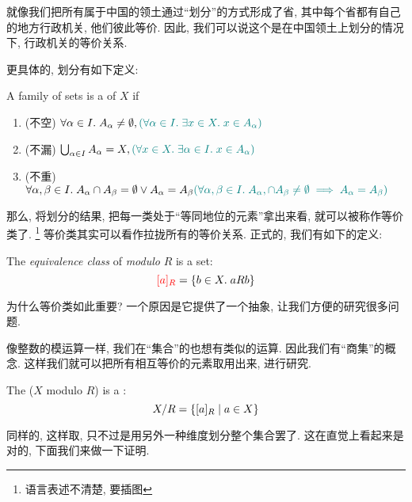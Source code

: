 就像我们把所有属于中国的领土通过``划分''的方式形成了省, 其中每个省都有自己的地方行政机关, 他们彼此等价. 因此, 我们可以说这个是在中国领土上划分的情况下, 行政机关的等价关系. 

更具体的, 划分有如下定义: 

\begin{definition}[划分 (Partition)]
  A family of sets 
  is a  of $X$ if

  \begin{enumerate}
    \item (不空)
      $\forall \alpha \in I.\; A_{\alpha} \neq \emptyset,\textcolor{teal}{(\forall \alpha \in I.\; \exists x \in X.\; x \in A_{\alpha})}$
    \item (不漏)
      $\bigcup_{\alpha \in I} A_{\alpha} = X, \textcolor{teal}{(\forall x \in X.\; \exists \alpha \in I.\; x \in A_{\alpha})}$
    \item (不重)
      $
        \forall \alpha, \beta \in I.\; A_{\alpha} \cap A_{\beta} = \emptyset \lor A_{\alpha} = A_{\beta}
        \textcolor{teal}{(\forall \alpha, \beta \in I.\; A_{\alpha}, \cap A_{\beta} \neq \emptyset \implies A_{\alpha} = A_{\beta})}
      $
  \end{enumerate}
\end{definition}

那么, 将划分的结果, 把每一类处于``等同地位的元素''拿出来看, 就可以被称作等价类了. \footnote{语言表述不清楚, 要插图} 等价类其实可以看作拉拢所有的等价关系. 正式的, 我们有如下的定义: 

\begin{definition}
  The {\it equivalence class} of  {\it modulo} $R$ is a set:
  \[
    \textcolor{red}{[a]_{R}} = \{b \in X.\; a R b\}
  \]
\end{definition}

为什么等价类如此重要? 一个原因是它提供了一个抽象, 让我们方便的研究很多问题. 

像整数的模运算一样, 我们在``集合''的也想有类似的运算. 因此我们有``商集''的概念. 这样我们就可以把所有相互等价的元素取用出来, 进行研究. 

\begin{definition}
  The   ($X$ modulo $R$)
  is a :
  \[
    X/R = \{[a]_{R} \mid a \in X\}
  \]
\end{definition}

同样的, 这样取, 只不过是用另外一种维度划分整个集合罢了. 这在直觉上看起来是对的, 下面我们来做一下证明. 


